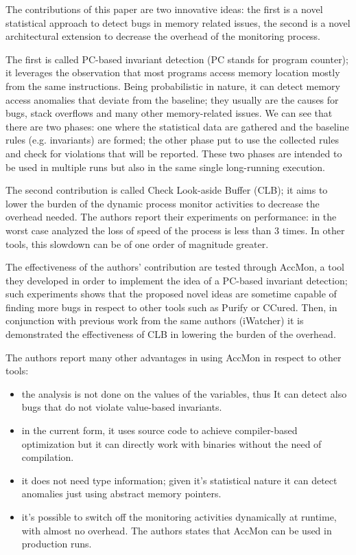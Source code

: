 The contributions of this paper are two innovative ideas: the first is a novel statistical approach to detect bugs in memory related issues, the second is a novel architectural extension to decrease the overhead of the monitoring process.

The first is called PC-based invariant detection (PC stands for program counter); it leverages the observation that most programs access memory location mostly from the same instructions. Being probabilistic in nature, it can detect memory access anomalies that deviate from the baseline; they usually are the causes for bugs, stack overflows and many other memory-related issues. We can see that there are two phases: one where the statistical data are gathered and the baseline rules (e.g. invariants) are formed; the other phase put to use the collected rules and check for violations that will be reported.
These two phases are intended to be used in multiple runs but also in the same single long-running execution.


The second contribution is called Check Look-aside Buffer (CLB); it aims to lower the burden of the dynamic process monitor activities to decrease the overhead needed. The authors report their experiments on performance: in the worst case analyzed the loss of speed of the process is less than 3 times. In other tools, this slowdown can be of one order of magnitude greater.

The effectiveness of the authors' contribution are tested through AccMon, a tool they developed in order to implement the idea of a PC-based invariant detection; such experiments shows that the proposed novel ideas are sometime capable of finding more bugs in respect to other tools such as Purify or CCured. Then, in conjunction with previous work from the same authors (iWatcher) it is demonstrated the effectiveness of CLB in lowering the burden of the overhead.

The authors report many other advantages in using AccMon in respect to other tools:
\begin{itemize} 
\item the analysis is not done on the values of the variables, thus It can detect also bugs that do not violate value-based invariants.
\item in the current form, it uses source code to achieve compiler-based optimization but it can directly work with binaries without the need of compilation.
\item it does not need type information; given it's statistical nature it can detect anomalies just using abstract memory pointers.
\item it's possible to switch off the monitoring activities dynamically at runtime, with almost no overhead. The authors states that AccMon can be used in production runs.
\end{itemize}


